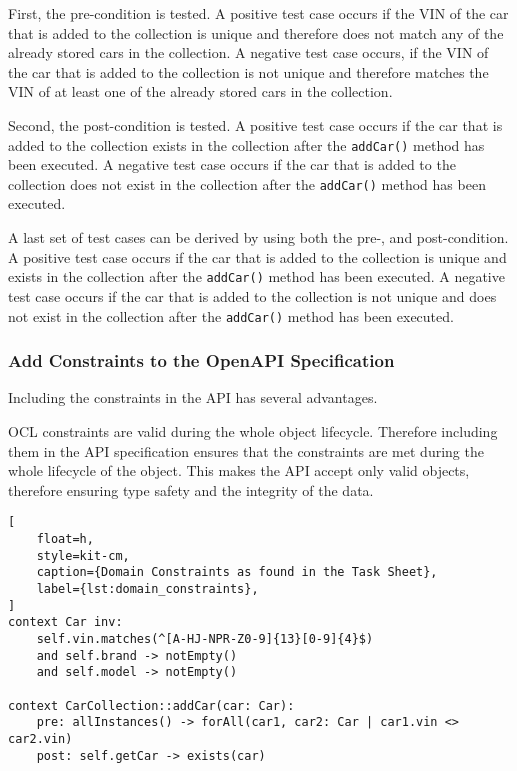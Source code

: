 First, the pre-condition is tested.
A positive test case occurs if the VIN of the car that is added to the collection is unique and therefore does not match any of the already stored cars in the collection.
A negative test case occurs, if the VIN of the car that is added to the collection is not unique and therefore matches the VIN of at least one of the already stored cars in the collection.

Second, the post-condition is tested.
A positive test case occurs if the car that is added to the collection exists in the collection after the \texttt{addCar()} method has been executed.
A negative test case occurs if the car that is added to the collection does not exist in the collection after the \texttt{addCar()} method has been executed.

A last set of test cases can be derived by using both the pre-, and post-condition.
A positive test case occurs if the car that is added to the collection is unique and exists in the collection after the \texttt{addCar()} method has been executed.
A negative test case occurs if the car that is added to the collection is not unique and does not exist in the collection after the \texttt{addCar()} method has been executed.

\subsubsection*{Add Constraints to the OpenAPI Specification}
Including the constraints in the API has several advantages.

OCL constraints are valid during the whole object lifecycle.
Therefore including them in the API specification ensures that the constraints are met during the whole lifecycle of the object.
This makes the API accept only valid objects, therefore ensuring type safety and the integrity of the data.


\begin{lstlisting}[
    float=h,
    style=kit-cm,
    caption={Domain Constraints as found in the Task Sheet},
    label={lst:domain_constraints}, 
]
context Car inv:
    self.vin.matches(^[A-HJ-NPR-Z0-9]{13}[0-9]{4}$)
    and self.brand -> notEmpty()
    and self.model -> notEmpty()

context CarCollection::addCar(car: Car):
    pre: allInstances() -> forAll(car1, car2: Car | car1.vin <> car2.vin)
    post: self.getCar -> exists(car)
\end{lstlisting}